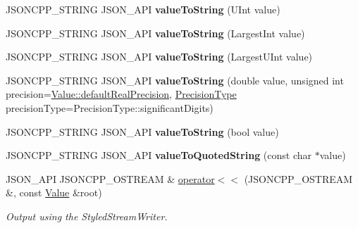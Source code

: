 \begin{DoxyCompactItemize}
\mbox{\label{namespaceJson_a99bc401be7f8a09a8439f3e7219b1f12}} 
J\+S\+O\+N\+C\+P\+P\+\_\+\+S\+T\+R\+I\+NG J\+S\+O\+N\+\_\+\+A\+PI {\bfseries value\+To\+String} (U\+Int value)
\item 
\mbox{\label{namespaceJson_a4732517cb28d203cfd4354d05952a81b}} 
J\+S\+O\+N\+C\+P\+P\+\_\+\+S\+T\+R\+I\+NG J\+S\+O\+N\+\_\+\+A\+PI {\bfseries value\+To\+String} (Largest\+Int value)
\item 
\mbox{\label{namespaceJson_a6283ea3db02efe9104ae6baff698245a}} 
J\+S\+O\+N\+C\+P\+P\+\_\+\+S\+T\+R\+I\+NG J\+S\+O\+N\+\_\+\+A\+PI {\bfseries value\+To\+String} (Largest\+U\+Int value)
\item 
\mbox{\label{namespaceJson_ac02258b61007c42eb3b317c0b210dffc}} 
J\+S\+O\+N\+C\+P\+P\+\_\+\+S\+T\+R\+I\+NG J\+S\+O\+N\+\_\+\+A\+PI {\bfseries value\+To\+String} (double value, unsigned int precision=\hyperlink{classJson_1_1Value_aaece556f282980ec2be4b39b9576075f}{Value\+::default\+Real\+Precision}, \hyperlink{namespaceJson_af6e1447a3c43e3a62e11050dd0a11ce8}{Precision\+Type} precision\+Type=Precision\+Type\+::significant\+Digits)
\item 
\mbox{\label{namespaceJson_a0a706a1fffba4fe8a8c1ef75b2dbbfab}} 
J\+S\+O\+N\+C\+P\+P\+\_\+\+S\+T\+R\+I\+NG J\+S\+O\+N\+\_\+\+A\+PI {\bfseries value\+To\+String} (bool value)
\item 
\mbox{\label{namespaceJson_aaf777a6923bcb4cf63a2729973fe5315}} 
J\+S\+O\+N\+C\+P\+P\+\_\+\+S\+T\+R\+I\+NG J\+S\+O\+N\+\_\+\+A\+PI {\bfseries value\+To\+Quoted\+String} (const char $\ast$value)
\item 
J\+S\+O\+N\+\_\+\+A\+PI J\+S\+O\+N\+C\+P\+P\+\_\+\+O\+S\+T\+R\+E\+AM \& \hyperlink{namespaceJson_a975d1dbca8aa7a06f38d373edcb9081c}{operator$<$$<$} (J\+S\+O\+N\+C\+P\+P\+\_\+\+O\+S\+T\+R\+E\+AM \&, const \hyperlink{classJson_1_1Value}{Value} \&root)
\begin{DoxyCompactList}\small\item\em Output using the Styled\+Stream\+Writer. \end{DoxyCompactList}\item 
\mbox{\label{namespaceJson_ac99d7a5551039dfa712dd1d143c25a16}} 

\end{DoxyCompactItemize}
